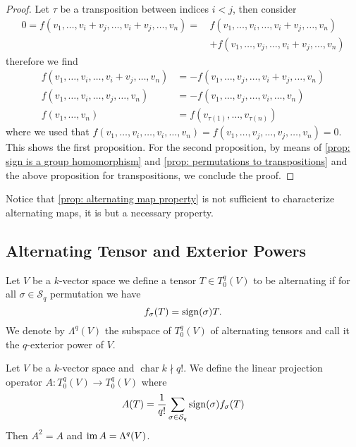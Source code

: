 \begin{proof}
  Let \(\tau\) be a transposition between indices \(i < j\), then consider
  \begin{align*}
    0 = f(v_1, \dots, v_i + v_j, \dots, v_i + v_j, \dots, v_n)
    =\, & f(v_1, \dots, v_i, \dots, v_i + v_j, \dots, v_n) \\
      & + f(v_1, \dots, v_j, \dots, v_i + v_j, \dots, v_n)
  \end{align*}
  therefore we find
  \begin{align*}
    f(v_1, \dots, v_i, \dots, v_i + v_j, \dots, v_n)
    &= - f(v_1, \dots, v_j, \dots, v_i + v_j, \dots, v_n) \\
    f(v_1, \dots, v_i, \dots, v_j, \dots, v_n)
    &= - f(v_1, \dots, v_j, \dots, v_i, \dots, v_n) \\
    f(v_1, \dots, v_n)
    &= f(v_{\tau(1)}, \dots, v_{\tau(n)})
  \end{align*}
  where we used that \(f(v_1, \dots, v_i, \dots, v_i, \dots, v_n) = f(v_1,
  \dots, v_j, \dots, v_j, \dots, v_n) = 0\). This shows the first proposition.
  For the second proposition, by means of \cref{prop: sign is a group
  homomorphism} and \cref{prop: permutations to transpositions} and the above
  proposition for transpositions, we conclude the proof.
\end{proof}

\begin{remark}
  Notice that \cref{prop: alternating map property} is not sufficient to
  characterize alternating maps, it is but a necessary property.
\end{remark}

\subsection{Alternating Tensor and Exterior Powers}

\begin{definition}
  \label{def: alternating tensor}
  Let \(V\) be a \(k\)-vector space we define a tensor \(T \in T_0^q(V)\) to be
  alternating if for all \(\sigma \in \mathcal S_q\) permutation we have
  \[
    f_\sigma(T) = \operatorname{sign}(\sigma) T.
  \]
  We denote by \(\Lambda^q(V)\) the subspace of \(T_0^q(V)\) of alternating
  tensors and call it the \(q\)-exterior power of \(V\).
\end{definition}

\begin{proposition}
  \label{prop: alternating projection}
  Let \(V\) be a \(k\)-vector space and \(\operatorname{char} k \nmid q!\). We
  define the linear projection operator \(A: T_0^q(V) \to T_0^q(V)\) where
  \[
    A(T) = \frac{1}{q!} \sum_{\sigma \in \mathcal S_q} \operatorname{sign}(\sigma)
    f_\sigma(T)
  \]
  Then \(A^2 = A\) and \(\operatorname{im} A = \Lambda^q(V)\).
\end{proposition}

